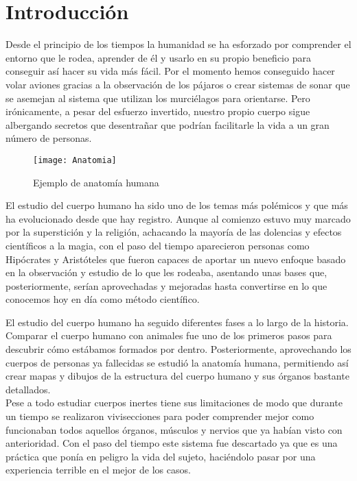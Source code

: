 \chapter{Introducción\label{sec:introduccion}}

Desde el principio de los tiempos la humanidad se ha esforzado por comprender el entorno que le rodea, aprender de él y usarlo en su propio beneficio para conseguir así hacer su vida más fácil. Por el momento hemos conseguido hacer volar aviones gracias a la observación de los pájaros o crear sistemas de sonar que se asemejan al sistema que utilizan los murciélagos para orientarse. Pero irónicamente, a pesar del esfuerzo invertido, nuestro propio cuerpo sigue albergando secretos que desentrañar que podrían facilitarle la vida a un gran número de personas.
\begin{wrapfigure}{r}{0.25\textwidth} %
    \centering
    \texttt{[image: Anatomia]}
    \caption{Ejemplo de anatomía humana}
\end{wrapfigure}

El estudio del cuerpo humano ha sido uno de los temas más polémicos y que más ha evolucionado desde que hay registro. Aunque al comienzo estuvo muy marcado por la superstición y la religión, achacando la mayoría de las dolencias y efectos científicos a la magia, con el paso del tiempo aparecieron personas como Hipócrates y Aristóteles que fueron capaces de aportar un nuevo enfoque basado en la observación y estudio de lo que les rodeaba, asentando unas bases que, posteriormente, serían aprovechadas y mejoradas hasta convertirse en lo que conocemos hoy en día como método científico.

El estudio del cuerpo humano ha seguido diferentes fases a lo largo de la historia. Comparar el cuerpo humano con animales fue uno de los primeros pasos para descubrir cómo estábamos formados por dentro. Posteriormente, aprovechando los cuerpos de personas ya fallecidas se estudió la anatomía humana, permitiendo así crear mapas y dibujos de la estructura del cuerpo humano y sus órganos bastante detallados.
\\Pese a todo estudiar cuerpos inertes tiene sus limitaciones de modo que durante un tiempo se realizaron vivisecciones para poder comprender mejor como funcionaban todos aquellos órganos, músculos y nervios que ya habían visto con anterioridad. Con el paso del tiempo este sistema fue descartado ya que es una práctica que ponía en peligro la vida del sujeto, haciéndolo pasar por una experiencia terrible en el mejor de los casos.

